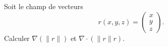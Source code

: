 
\begin{exercice}\label{exoOutilsMath-0067}

    Soit le champ de vecteurs
    \begin{equation}
        r(x,y,z)=\begin{pmatrix}
            x    \\ 
            y    \\ 
            z    
        \end{pmatrix}.
    \end{equation}
    Calculer $\nabla(\| r \|)$ et $\nabla\cdot(\| r \|r)$.

\end{exercice}
